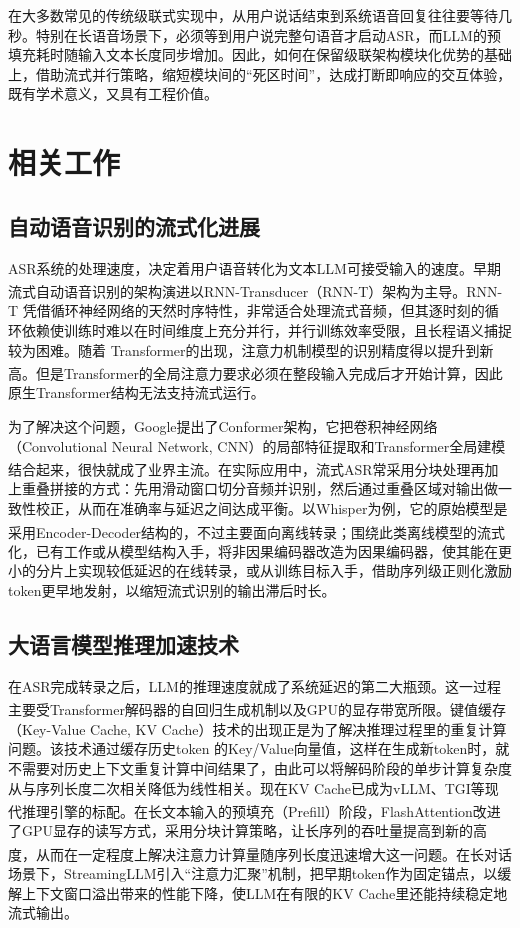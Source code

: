 \documentclass[UTF8,a4paper,zihao=5]{ctexart}
\newcommand{\upcite}[1]{\textsuperscript{\cite{#1}}}
\begin{document}
在大多数常见的传统级联式实现中，从用户说话结束到系统语音回复往往要等待几秒。特别在长语音场景下，必须等到用户说完整句语音才启动ASR，而LLM的预填充耗时随输入文本长度同步增加。因此，如何在保留级联架构模块化优势的基础上，借助流式并行策略，缩短模块间的“死区时间”，达成打断即响应的交互体验，既有学术意义，又具有工程价值。

\section{相关工作}

\subsection{自动语音识别的流式化进展}

ASR系统的处理速度，决定着用户语音转化为文本LLM可接受输入的速度。早期流式自动语音识别的架构演进以RNN-Transducer（RNN-T）架构为主导\upcite{ref3}。RNN-T 凭借循环神经网络的天然时序特性，非常适合处理流式音频，但其逐时刻的循环依赖使训练时难以在时间维度上充分并行，并行训练效率受限，且长程语义捕捉较为困难。随着 Transformer的出现，注意力机制模型的识别精度得以提升到新高\upcite{ref4}。但是Transformer的全局注意力要求必须在整段输入完成后才开始计算，因此原生Transformer结构无法支持流式运行。

为了解决这个问题，Google提出了Conformer架构，它把卷积神经网络（Convolutional Neural Network, CNN）的局部特征提取和Transformer全局建模结合起来，很快就成了业界主流\upcite{ref5}。在实际应用中，流式ASR常采用分块处理再加上重叠拼接的方式：先用滑动窗口切分音频并识别，然后通过重叠区域对输出做一致性校正，从而在准确率与延迟之间达成平衡。以Whisper为例，它的原始模型是采用Encoder-Decoder结构的，不过主要面向离线转录\upcite{ref6}；围绕此类离线模型的流式化，已有工作或从模型结构入手，将非因果编码器改造为因果编码器，使其能在更小的分片上实现较低延迟的在线转录，或从训练目标入手，借助序列级正则化激励token更早地发射，以缩短流式识别的输出滞后时长。

\subsection{大语言模型推理加速技术}

在ASR完成转录之后，LLM的推理速度就成了系统延迟的第二大瓶颈。这一过程主要受Transformer解码器的自回归生成机制以及GPU的显存带宽所限\upcite{ref7}。键值缓存（Key-Value Cache, KV Cache）技术的出现正是为了解决推理过程里的重复计算问题。该技术通过缓存历史token 的Key/Value向量值，这样在生成新token时，就不需要对历史上下文重复计算中间结果了，由此可以将解码阶段的单步计算复杂度从与序列长度二次相关降低为线性相关。现在KV Cache已成为vLLM、TGI等现代推理引擎的标配\upcite{ref8}。在长文本输入的预填充（Prefill）阶段，FlashAttention改进了GPU显存的读写方式，采用分块计算策略，让长序列的吞吐量提高到新的高度，从而在一定程度上解决注意力计算量随序列长度迅速增大这一问题\upcite{ref9}。在长对话场景下，StreamingLLM引入“注意力汇聚”机制，把早期token作为固定锚点，以缓解上下文窗口溢出带来的性能下降，使LLM在有限的KV Cache里还能持续稳定地流式输出。
\end{document}

